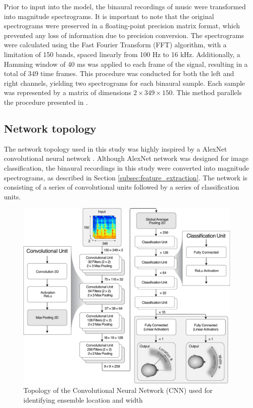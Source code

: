 \documentclass{article}
\begin{document}

Prior to input into the model, the binaural recordings of music were transformed into magnitude spectrograms. It is important to note that the original spectrograms were preserved in a floating-point precision matrix format, which prevented any loss of information due to precision conversion. The spectrograms were calculated using the Fast Fourier Transform (FFT) algorithm, with a limitation of 150 bands, spaced linearly from 100 Hz to 16 kHz. Additionally, a Hamming window of 40 ms was applied to each frame of the signal, resulting in a total of 349 time frames. This procedure was conducted for both the left and right channels, yielding two spectrograms for each binaural sample. Each sample was represented by a matrix of dimensions $2 \times 349 \times 150$. This method parallels the procedure presented in \cite{zielinski_automatic_2022}.

\subsection{Network topology}
\label{subsec:topology}

The network topology used in this study was highly inspired by a AlexNet convolutional neural network \cite{krizhevsky_imagenet_2012}. Although AlexNet network was designed for image classification, the binaural recordings in this study were converted into magnitude spectrograms, as described in Section \ref{subsec:feature_extraction}. The network is consisting of a series of convolutional units followed by a series of classification units.

\begin{figure}[ht]
  \centering
  \includegraphics[width=\linewidth]{../pictures/architecture.pdf}
  \caption{\label{fig:architecture}Topology of the Convolutional Neural Network (CNN) used for identifying ensemble location and width}
\end{figure}
\end{document}
